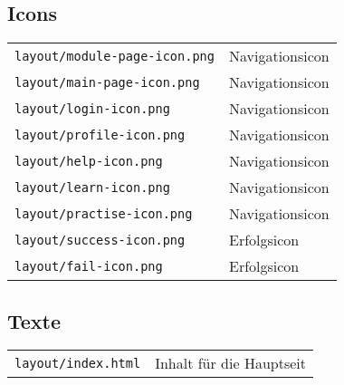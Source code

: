 \setcounter{section}{0}
\setcounter{subsection}{0}
\renewcommand*\thesection{\Alph{section}}







\subsection{Icons}
\begin{tabular}{ | p{} | p{} | } 
	\texttt{layout/module-page-icon.png}	& Navigationsicon\\
	\texttt{layout/main-page-icon.png}	& Navigationsicon\\
	\texttt{layout/login-icon.png}	& Navigationsicon\\
	\texttt{layout/profile-icon.png}	& Navigationsicon\\
	\texttt{layout/help-icon.png}	& Navigationsicon\\
	\texttt{layout/learn-icon.png}	& Navigationsicon\\
	\texttt{layout/practise-icon.png}	& Navigationsicon\\
	\texttt{layout/success-icon.png}	& Erfolgsicon\\
	\texttt{layout/fail-icon.png}	& Erfolgsicon\\
\end{tabular}

\subsection{Texte}
\begin{tabular}{ | p{} | p{} | } 
	\texttt{layout/index.html}	& Inhalt für die Hauptseit\\
\end{tabular}

